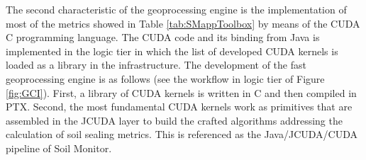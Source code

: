 \documentclass[APA,LATO1COL,doublespace]{WileyNJD-v2}
\newcommand{\toberevised}[1]{\emph{\textcolor{red}{#1}}} %
\begin{document}
The second characteristic of the geoprocessing engine is the implementation of most of the metrics showed in Table \ref{tab:SMappToolbox} by means of the CUDA C programming language.
The CUDA code and its binding from Java is implemented in the logic tier in which %
the list of developed CUDA kernels is loaded as a library in the infrastructure.
The development of the fast geoprocessing engine is as follows (see the workflow in logic tier of Figure \ref{fig:GCI}).
First, a library of CUDA kernels is written in C and then compiled in PTX. 
Second, the most fundamental CUDA kernels work as primitives that are assembled in the JCUDA layer to build the crafted algorithms  addressing the calculation of soil sealing metrics.
This is referenced as the Java/JCUDA/CUDA pipeline of Soil Monitor.%
\end{document}
